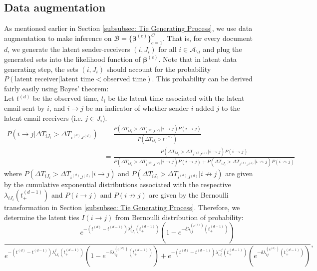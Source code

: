 \documentclass[a4paper]{article}
\begin{document}
  \subsection{Data augmentation} \label{subsec: Data augmentation}
  As mentioned earlier in Section \ref{subsubsec: Tie Generating Process}, we use data augmentation to make inference on $\mathcal{B}=\{\boldsymbol{\beta}^{(c)} \}_{c=1}^{C}$. That is, for every document $d$, we generate the latent sender-receivers $(i, J_i)$ for all $i \in \mathcal{A}_{\backslash i}$ and plug the generated sets into the likelihood function of $\boldsymbol{\beta}^{(c)}$. Note that in latent data generating step, the sets $(i, J_i)$ should account for the probability $P(\mbox{latent receiver}| \mbox{latent time} < \mbox{observed time})$. This probability can be derived fairly easily using Bayes' theorem: \\\newline
Let $t^{(d)}$ be the observed time, $t_i$ be the latent time associated with the latent email sent by $i$, and $i \rightarrow j$ be an indicator of whether sender $i$ added $j$ to the latent email receivers (i.e. $j \in J_i$). 
  \begin{equation}
  \begin{split}
P(i \rightarrow j|\Delta T_{i{J_i}} > \Delta T_{i^{(d)}{J^{(d)}}}) &= \frac{P(\Delta T_{i{J_i}} > \Delta T_{i^{(d)}{J^{(d)}}}|i \rightarrow j)P(i \rightarrow j)}{P(\Delta T_{i{J_i}} > t^{(d)})}  \\&= \frac{P(\Delta T_{i{J_i}}> \Delta T_{i^{(d)}{J^{(d)}}}|i \rightarrow j)P(i \rightarrow j)}{P(\Delta T_{i{J_i}} > \Delta T_{i^{(d)}{J^{(d)}}}|i \rightarrow j)P(i \rightarrow j) + P(\Delta T_{i{J_i}} > \Delta T_{i^{(d)}{J^{(d)}}}|i \not\to j)P(i \not\to j)} 
  \end{split}
  \end{equation}
  where $P(\Delta T_{i{J_i}}> \Delta T_{i^{(d)}{J^{(d)}}}|i \rightarrow j)$ and $P(\Delta T_{i{J_i}} >\Delta T_{i^{(d)}{J^{(d)}}}|i \not\to j)$ are given by the cumulative exponential distributions associated with the respective $\lambda_{iJ_i}(t_+^{(d-1)})$ and $P(i \rightarrow j)$ and $P(i \not\to j)$ are given by the Bernoulli transformation in Section \ref{subsubsec: Tie Generating Process}. Therefore, we determine the latent ties $I(i\rightarrow j)$ from Bernoulli distribution of probability:
    \begin{equation}
 \frac{e^{-(t^{(d)}-t^{(d-1)})\lambda^j_{iJ_i}(t_+^{(d-1)})}(1-e^{-\delta\lambda^{(c^{(d)})}_{ij}(t_+^{(d-1)})})}{e^{-(t^{(d)}-t^{(d-1)})\lambda^j_{iJ_i}(t_+^{(d-1)})}(1-e^{-\delta\lambda^{(c^{(d)})}_{ij}(t_+^{(d-1)})})+e^{-(t^{(d)}-t^{(d-1)})\lambda^{-j}_{iJ_i}(t_+^{(d-1)})}(e^{-\delta\lambda^{(c^{(d)})}_{ij}(t_+^{(d-1)})})},
    \end{equation}
\end{document}
